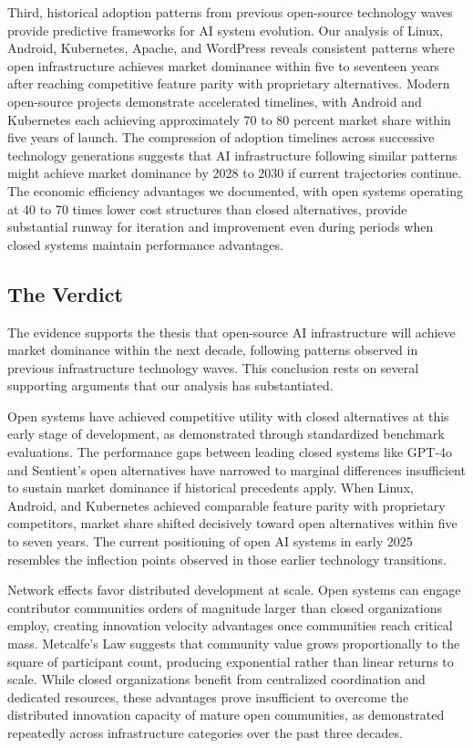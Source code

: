 Third, historical adoption patterns from previous open-source technology waves provide predictive frameworks for AI system evolution. Our analysis of Linux, Android, Kubernetes, Apache, and WordPress reveals consistent patterns where open infrastructure achieves market dominance within five to seventeen years after reaching competitive feature parity with proprietary alternatives. Modern open-source projects demonstrate accelerated timelines, with Android and Kubernetes each achieving approximately 70 to 80 percent market share within five years of launch. The compression of adoption timelines across successive technology generations suggests that AI infrastructure following similar patterns might achieve market dominance by 2028 to 2030 if current trajectories continue. The economic efficiency advantages we documented, with open systems operating at 40 to 70 times lower cost structures than closed alternatives, provide substantial runway for iteration and improvement even during periods when closed systems maintain performance advantages.

\subsection{The Verdict}

The evidence supports the thesis that open-source AI infrastructure will achieve market dominance within the next decade, following patterns observed in previous infrastructure technology waves. This conclusion rests on several supporting arguments that our analysis has substantiated.

Open systems have achieved competitive utility with closed alternatives at this early stage of development, as demonstrated through standardized benchmark evaluations. The performance gaps between leading closed systems like GPT-4o and Sentient's open alternatives have narrowed to marginal differences insufficient to sustain market dominance if historical precedents apply. When Linux, Android, and Kubernetes achieved comparable feature parity with proprietary competitors, market share shifted decisively toward open alternatives within five to seven years. The current positioning of open AI systems in early 2025 resembles the inflection points observed in those earlier technology transitions.

Network effects favor distributed development at scale. Open systems can engage contributor communities orders of magnitude larger than closed organizations employ, creating innovation velocity advantages once communities reach critical mass. Metcalfe's Law suggests that community value grows proportionally to the square of participant count, producing exponential rather than linear returns to scale. While closed organizations benefit from centralized coordination and dedicated resources, these advantages prove insufficient to overcome the distributed innovation capacity of mature open communities, as demonstrated repeatedly across infrastructure categories over the past three decades.

